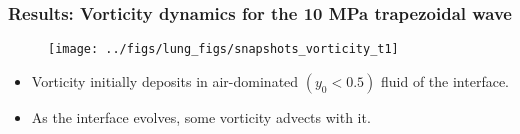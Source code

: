 \begin{frame} \frametitle{\vspace*{0.5cm}Results: Vorticity dynamics for the 10 MPa trapezoidal wave}
  \begin{figure}
    \centering
    \texttt{[image: ../figs/lung\_figs/snapshots\_vorticity\_t1]}
  \end{figure}
  {\small
    \begin{itemize}
    \item Vorticity initially deposits in air-dominated $(y_0<0.5)$
      fluid of the interface.
    \item As the interface evolves, some vorticity advects with it.
    \end{itemize}
  }
\end{frame}

